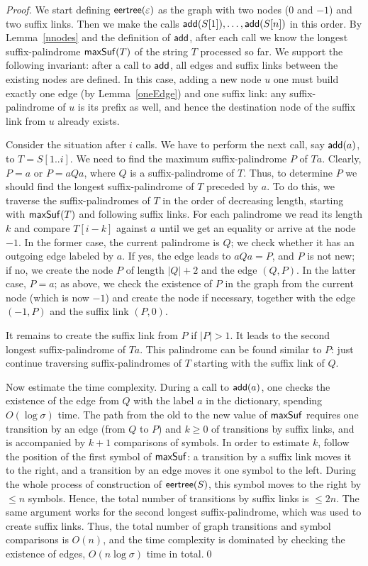 \documentclass{llncs}
\def\add{{\sf add}}
\def\eertree{{\sf eertree}}
\def\maxsuf{{\sf maxSuf}}
\begin{document}
\begin{proof}
We start defining $\eertree(\varepsilon)$ as the graph with two nodes ($0$ and $-1$) and two suffix links. Then we make the calls $\add(S[1]),\ldots,\add(S[n])$ in this order. By Lemma~\ref{nnodes} and the definition of $\add$, after each call we know the longest suffix-palindrome $\maxsuf(T)$ of the string $T$ processed  so far. We support the following invariant: after a call to $\add$, all edges and suffix links between the existing nodes are defined. In this case, adding a new node $u$ one must build exactly one edge (by Lemma~\ref{oneEdge}) and one suffix link: any suffix-palindrome of $u$ is its prefix as well, and hence the destination node of the suffix link from $u$ already exists.

Consider the situation after $i$ calls. We have to perform the next call, say $\add(a)$, to $T=S[1..i]$. We need to find the maximum suffix-palindrome $P$ of $Ta$. Clearly, $P=a$ or $P=aQa$, where $Q$ is a suffix-palindrome of $T$. Thus, to determine $P$ we should find the longest suffix-palindrome of $T$ preceded by $a$. To do this, we traverse the suffix-palindromes of $T$ in the order of decreasing length, starting with $\maxsuf(T)$ and following suffix links. For each palindrome we read its length $k$ and compare $T[i{-}k]$ against $a$ until we get an equality or arrive at the node $-1$. In the former case, the current palindrome is $Q$; we check whether it has an outgoing edge labeled by $a$. If yes, the edge leads to $aQa=P$, and $P$ is not new; if no, we create the node $P$ of length $|Q|+2$ and the edge $(Q,P)$. In the latter case, $P=a$; as above, we check the existence of $P$ in the graph from the current node (which is now $-1$) and create the node if necessary, together with the edge $(-1,P)$ and the suffix link $(P,0)$. 

It remains to create the suffix link from $P$ if $|P|>1$. It leads to the second longest suffix-palindrome of $Ta$. This palindrome can be found similar to $P$: just continue traversing suffix-palindromes of $T$ starting with the suffix link of $Q$. 

Now estimate the time complexity. During a call to $\add(a)$, one checks the existence of the edge from $Q$ with the label $a$ in the dictionary, spending $O(\log\sigma)$ time. The path from the old to the new value of $\maxsuf$ requires one transition by an edge (from $Q$ to $P$) and $k\ge0$ of transitions by suffix links, and is accompanied by $k{+}1$ comparisons of symbols. In order to estimate $k$, follow the position of the first symbol of $\maxsuf$: a transition by a suffix link moves it to the right, and a transition by an edge moves it one symbol to the left. During the whole process of construction of $\eertree(S)$, this symbol moves to the right by $\le n$ symbols. Hence, the total number of transitions by suffix links is $\le 2n$. The same argument works for the second longest suffix-palindrome, which was used to create suffix links. Thus, the total number of graph transitions and symbol comparisons is $O(n)$, and the time complexity is dominated by checking the existence of edges, $O(n\log\sigma)$ time in total.\qed
\end{proof}
\end{document}
